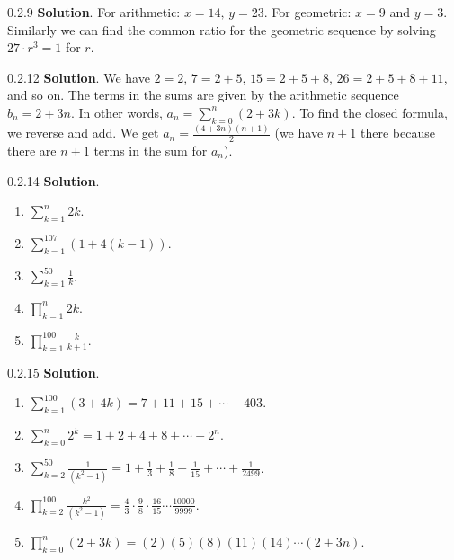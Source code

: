 \documentclass[11pt,]{book}
\theoremstyle{ptxplainnotitle}
\theoremstyle{ptxplaintitle}
\theoremstyle{ptxdefinitionnotitle}
\theoremstyle{ptxdefinitiontitle}
\theoremstyle{ptxdefinitionnotitle}
\theoremstyle{ptxdefinitiontitle}
\theoremstyle{ptxdefinitionnotitle}
\theoremstyle{ptxdefinitiontitle}
\theoremstyle{ptxdefinitiontitlenonumber}
\theoremstyle{ptxdefinitiontitlenonumber}
\numberwithin{equation}{chapter}
\renewcommand{\d}{\displaystyle}
\begin{document}
\begin{divisionexercise}{0.2.9}
\textbf{Solution}.\quad%
\hypertarget{p-327}{}%
For arithmetic: \(x = 14\text{,}\) \(y = 23\text{.}\) For geometric: \(x = 9\) and \(y = 3\text{.}\)    Similarly we can find the common ratio for the geometric sequence by solving \(27\cdot r^3 = 1\) for \(r\text{.}\)%
\end{divisionexercise}%
\begin{divisionexercise}{0.2.12}
\textbf{Solution}.\quad%
\hypertarget{p-336}{}%
We have \(2 = 2\), \(7 = 2+5\), \(15 = 2 + 5 + 8\), \(26 = 2+5+8+11\), and so on. The terms in the sums are given by the arithmetic sequence \(b_n = 2+3n\). In other words, \(a_n = \sum_{k=0}^n (2+3k)\). To find the closed formula, we reverse and add. We get \(a_n = \frac{(4+3n)(n+1)}{2}\) (we have \(n+1\) there because there are \(n+1\) terms in the sum for \(a_n\)).%
\end{divisionexercise}%
\begin{divisionexercise}{0.2.14}
\textbf{Solution}.\quad%
\hypertarget{p-345}{}%
\leavevmode%
\begin{enumerate}[label=(\alph*)]
\item\hypertarget{li-184}{}\(\d\sum_{k=1}^n 2k\).%
\item\hypertarget{li-185}{}\(\d\sum_{k=1}^{107} (1 + 4(k-1))\).%
\item\hypertarget{li-186}{}\(\d\sum_{k=1}^{50} \frac{1}{k}\).%
\item\hypertarget{li-187}{}\(\d\prod_{k=1}^n 2k\).%
\item\hypertarget{li-188}{}\(\d\prod_{k=1}^{100} \frac{k}{k+1}\).%
\end{enumerate}
%
\end{divisionexercise}%
\begin{divisionexercise}{0.2.15}
\textbf{Solution}.\quad%
\hypertarget{p-348}{}%
\leavevmode%
\begin{enumerate}[label=(\alph*)]
\item\hypertarget{li-194}{}\(\d\sum_{k=1}^{100} (3+4k) = 7 + 11 + 15 + \cdots + 403\).%
\item\hypertarget{li-195}{}\(\d\sum_{k=0}^n 2^k = 1 + 2 + 4 + 8 + \cdots + 2^n\).%
\item\hypertarget{li-196}{}\(\d\sum_{k=2}^{50}\frac{1}{(k^2 - 1)} = 1 + \frac{1}{3} + \frac{1}{8} + \frac{1}{15} + \cdots + \frac{1}{2499}\).%
\item\hypertarget{li-197}{}\(\d\prod_{k=2}^{100}\frac{k^2}{(k^2-1)} = \frac{4}{3}\cdot\frac{9}{8}\cdot\frac{16}{15}\cdots\frac{10000}{9999}\).%
\item\hypertarget{li-198}{}\(\d\prod_{k=0}^n (2+3k) = (2)(5)(8)(11)(14)\cdots(2+3n)\).%
\end{enumerate}
%
\end{divisionexercise}%
\end{document}
